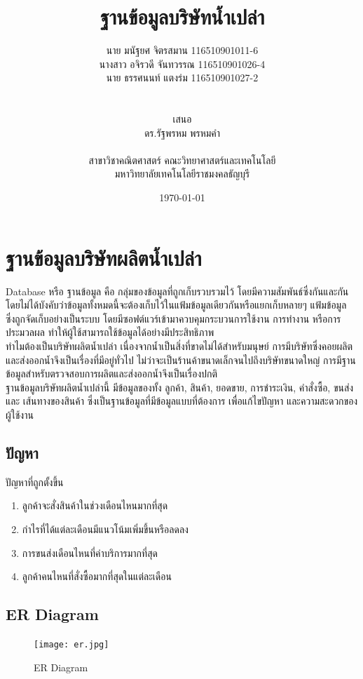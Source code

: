 \documentclass{report}
\title{ฐานข้อมูลบริษัทน้ำเปล่า}
\author{
\begin{tabular}{ll}
นาย มนัฐยศ จิตรสมาน 116510901011-6\\
นางสาว อจิรวดี จันทวรรณ 116510901026-4\\
นาย ธรรศนนท์ แตงร่ม 116510901027-2\\
\end{tabular}\\ 
\\
เสนอ\\
ดร.รัฐพรหม พรหมคำ\\
\\
สาขาวิชาคณิตศาสตร์ คณะวิทยาศาสตร์และเทคโนโลยี\\
มหาวิทยาลัยเทคโนโลยีราชมงคลธัญบุรี
}
\date{\today}
\begin{document}
 
\maketitle 
\tableofcontents 

\chapter{ฐานข้อมูลบริษัทผลิตน้ำเปล่า}
Database หรือ ฐานข้อมูล คือ กลุ่มของข้อมูลที่ถูกเก็บรวบรวมไว้ โดยมีความสัมพันธ์ซึ่งกันและกัน โดยไม่ได้บังคับว่าข้อมูลทั้งหมดนี้จะต้องเก็บไว้ในแฟ้มข้อมูลเดียวกันหรือแยกเก็บหลายๆ แฟ้มข้อมูล ซึ่งถูกจัดเก็บอย่างเป็นระบบ โดยมีซอฟต์แวร์เข้ามาควบคุมกระบวนการใช้งาน การทำงาน หรือการประมวลผล ทำให้ผู้ใช้สามารถใช้ข้อมูลได้อย่างมีประสิทธิภาพ\\
ทำไมต้องเป็นบริษัทผลิตน้ำเปล่า เนื่องจากน้ำเป็นสิ่งที่ขาดไม่ได้สำหรับมนุษย์ การมีบริษัทซึ่งคอยผลิตและส่งออกน้ำจึงเป็นเรื่องที่มีอยู่ทั่วไป
ไม่ว่าจะเป็นร้านค้าขนาดเล็กจนไปถึงบริษัทขนาดใหญ่ การมีฐานข้อมูลสำหรับตรวจสอบการผลิตและส่งออกน้ำจึงเป็นเรื่องปกติ \\
ฐานข้อมูลบริษัทผลิตน้ำเปล่านี้ มีข้อมูลของทั้ง ลูกค้า, สินค้า, ยอดขาย, การชำระเงิน, คำสั่งซื้อ, ขนส่ง และ เส้นทางของสินค้า
ซึ่งเป็นฐานข้อมูลที่มีข้อมูลแบบที่ต้องการ เพื่อแก้ไขปัญหา และความสะดวกของผู้ใช้งาน
\section{ปัญหา}
ปัญหาที่ถูกตั้งขึ้น
\begin{enumerate}
    \item{ลูกค้าจะสั่งสินค้าในช่วงเดือนไหนมากที่สุด}
    \item{กำไรที่ได้แต่ละเดือนมีแนวโน้มเพิ่มขึ้นหรือลดลง}
    \item{การขนส่งเดือนไหนที่ค่าบริการมากที่สุด}
    \item{ลูกค้าคนไหนที่สั่งซื้อมากที่สุดในแต่ละเดือน}
\end{enumerate}
\section{ER Diagram}
\begin{figure}[h]
    \centering
    \texttt{[image: er.jpg]}
    \caption{ER Diagram}
\end{figure}
\end{document}
